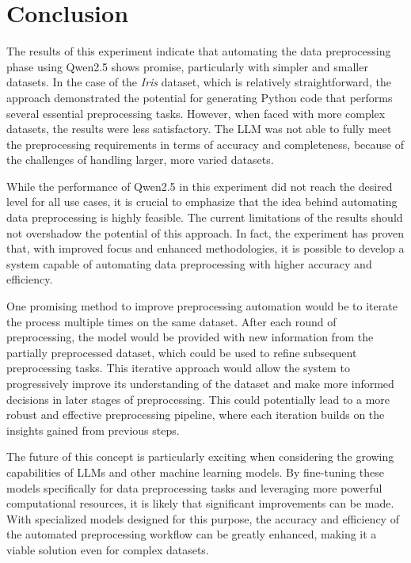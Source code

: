 \chapter{Conclusion}

The results of this experiment indicate that automating the data preprocessing phase using Qwen2.5 shows promise, particularly with simpler and smaller datasets. In the case of the \textit{Iris} dataset, which is relatively straightforward, the approach demonstrated the potential for generating Python code that performs several essential preprocessing tasks. However, when faced with more complex datasets, the results were less satisfactory. The LLM was not able to fully meet the preprocessing requirements in terms of accuracy and completeness, because of the challenges of handling larger, more varied datasets.

While the performance of Qwen2.5 in this experiment did not reach the desired level for all use cases, it is crucial to emphasize that the idea behind automating data preprocessing is highly feasible. The current limitations of the results should not overshadow the potential of this approach. In fact, the experiment has proven that, with improved focus and enhanced methodologies, it is possible to develop a system capable of automating data preprocessing with higher accuracy and efficiency.

One promising method to improve preprocessing automation would be to iterate the process multiple times on the same dataset. After each round of preprocessing, the model would be provided with new information from the partially preprocessed dataset, which could be used to refine subsequent preprocessing tasks. This iterative approach would allow the system to progressively improve its understanding of the dataset and make more informed decisions in later stages of preprocessing. This could potentially lead to a more robust and effective preprocessing pipeline, where each iteration builds on the insights gained from previous steps.

The future of this concept is particularly exciting when considering the growing capabilities of LLMs and other machine learning models. By fine-tuning these models specifically for data preprocessing tasks and leveraging more powerful computational resources, it is likely that significant improvements can be made. With specialized models designed for this purpose, the accuracy and efficiency of the automated preprocessing workflow can be greatly enhanced, making it a viable solution even for complex datasets.

